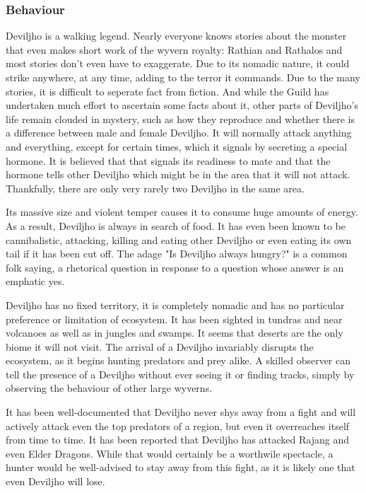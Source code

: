 \subsubsection{Behaviour}
Deviljho is a walking legend. Nearly everyone knows stories about the monster that even makes short work of the wyvern royalty: Rathian and Rathalos and most stories don't even have to exaggerate. Due to its nomadic nature, it could strike anywhere, at any time, adding to the terror it commands. Due to the many stories, it is difficult to seperate fact from fiction. And while the Guild has undertaken much effort to ascertain some facts about it, other parts of Deviljho's life remain clouded in mystery, such as how they reproduce and whether there is a difference between male and female Deviljho. It will normally attack anything and everything, except for certain times, which it signals by secreting a special hormone. It is believed that that signals its readiness to mate and that the hormone tells other Deviljho which might be in the area that it will not attack. Thankfully, there are only very rarely two Deviljho in the same area.

Its massive size and violent temper causes it to consume huge amounts of energy. As a result, Deviljho is always in search of food. It has even been known to be cannibalistic, attacking, killing and eating other Deviljho or even eating its own tail if it has been cut off. The adage "Is Deviljho always hungry?" is a common folk saying, a rhetorical question in response to a question whose answer is an emphatic yes.

Deviljho has no fixed territory, it is completely nomadic and has no particular preference or limitation of ecosystem. It has been sighted in tundras and near volcanoes as well as in jungles and swamps. It seems that deserts are the only biome it will not visit. The arrival of a Deviljho invariably disrupts the ecosystem, as it begins hunting predators and prey alike. A skilled observer can tell the presence of a Deviljho without ever seeing it or finding tracks, simply by observing the behaviour of other large wyverns.

It has been well-documented that Deviljho never shys away from a fight and will actively attack even the top predators of a region, but even it overreaches itself from time to time. It has been reported that Deviljho has attacked Rajang and even Elder Dragons. While that would certainly be a worthwile spectacle, a hunter would be well-advised to stay away from this fight, as it is likely one that even Deviljho will lose.

